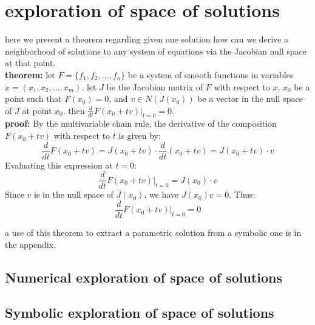 \section*{exploration of space of solutions}
here we present a theorem regarding given one solution how can we derive a neighborhood of solutions to any system of equations via the Jacobian null space at that point.
\\\textbf{theorem:} let $F = \{f_1, f_2, \ldots, f_n\}$ be a system of smooth functions in variables $x = (x_1, x_2, \ldots, x_m)$. let $J$ be the Jacobian matrix of $F$ with respect to $x$, $x_0$ be a point such that $F(x_0) = 0$, and $v \in N(J(x_0))$ be a vector in the null space of $J$ at point $x_0$. 
then $\frac{d}{dt}F(x_0 + tv)|_{t=0} = 0$.
\\\textbf{proof:} By the multivariable chain rule, the derivative of the composition $F(x_0 + tv)$ with respect to $t$ is given by:
\[\frac{d}{dt}F(x_0 + tv) = J(x_0 + tv) \cdot \frac{d}{dt}(x_0 + tv) = J(x_0 + tv) \cdot v\] 
Evaluating this expression at $t=0$: \[\frac{d}{dt}F(x_0 + tv)\bigg|_{t=0} = J(x_0) \cdot v\]
Since $v$ is in the null space of $J(x_0)$, we have $J(x_0)v = 0$. Thus: \[ \frac{d}{dt}F(x_0 + tv)\bigg|_{t=0} = 0 \]

a use of this theorem to extract a parametric solution from a symbolic one is in the appendix. 

\subsection*{Numerical exploration of space of solutions}

\subsection*{Symbolic exploration of space of solutions}
